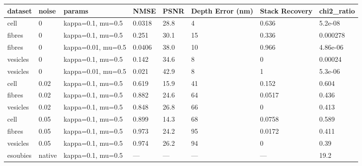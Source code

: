 \begin{center}\begin{minipage}{\linewidth}\centering
{}
\begin{adjustbox}{max width=\linewidth}
\begin{tabular}{llllllll}
\toprule
dataset & noise & params & NMSE & PSNR & Depth Error (nm) & Stack Recovery & chi2\_ratio \\
\midrule
cell & 0 & kappa=0.1, mu=0.5 & 0.0318 & 28.8 & 4 & 0.636 & 5.2e-08 \\
fibres & 0 & kappa=0.1, mu=0.5 & 0.251 & 30.1 & 15 & 0.336 & 0.000278 \\
fibres & 0 & kappa=0.01, mu=0.5 & 0.0406 & 38.0 & 10 & 0.966 & 4.86e-06 \\
vesicles & 0 & kappa=0.1, mu=0.5 & 0.142 & 34.6 & 8 & 0 & 0.00024 \\
vesicles & 0 & kappa=0.01, mu=0.5 & 0.021 & 42.9 & 8 & 1 & 5.3e-06 \\
cell & 0.02 & kappa=0.1, mu=0.5 & 0.619 & 15.9 & 41 & 0.152 & 0.604 \\
fibres & 0.02 & kappa=0.1, mu=0.5 & 0.882 & 24.6 & 64 & 0.0517 & 0.436 \\
vesicles & 0.02 & kappa=0.1, mu=0.5 & 0.848 & 26.8 & 66 & 0 & 0.413 \\
cell & 0.05 & kappa=0.1, mu=0.5 & 0.899 & 14.3 & 68 & 0.0758 & 0.589 \\
fibres & 0.05 & kappa=0.1, mu=0.5 & 0.973 & 24.2 & 95 & 0.0172 & 0.411 \\
vesicles & 0.05 & kappa=0.1, mu=0.5 & 0.974 & 26.2 & 94 & 0 & 0.39 \\
esoubies & native & kappa=0.1, mu=0.5 & — & — & — & — & 19.2 \\
\bottomrule
\end{tabular}\end{adjustbox}\end{minipage}\end{center}
